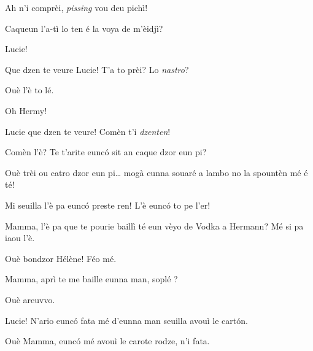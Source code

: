 \begin{drama}
\Cesarspeaks  Ah n'i comprèi, \textit{pissing} vou deu pichì!



\Luciespeaks  Caqueun l’a-tì lo ten é la voya de m’èidjì? 

\Hermannspeaks Lucie!


\Cesarspeaks Que dzen te veure Lucie! T'a to prèi? Lo \textit{nastro}?

\Luciespeaks Ouè l'è to lé.


\Luciespeaks{} Oh Hermy!

\Hermannspeaks Lucie que dzen te veure! Comèn t'i \textit{dzenten}!


\Luciespeaks Comèn l'è? Te t'arite eunc\'o sit an caque dzor eun pi? 

\Hermannspeaks Ouè trèi ou catro dzor eun pi\ldots {} mogà eunna souaré a lambo no la spountèn mé é té!


\Luciespeaks Mi seuilla l'è pa eunc\'o preste ren!  L'è eunc\'o to pe l'er!

\Helenespeaks{}  Mamma, l'è pa que te pourie baillì té eun vèyo de Vodka a Hermann? Mé si pa iaou l'è.

\Luciespeaks Ouè bondzor Hélène! Féo mé. 


\Remyspeaks  {} Mamma, aprì te me baille eunna man, soplé \please ?

\Luciespeaks Ouè areuvvo.

\Cesarspeaks Lucie! N'ario eunc\'o fata mé d'eunna man seuilla avouì le cart\'on.

\Helenespeaks  Ouè Mamma, eunc\'o mé avouì le carote rodze, n'i fata.


\end{drama}

